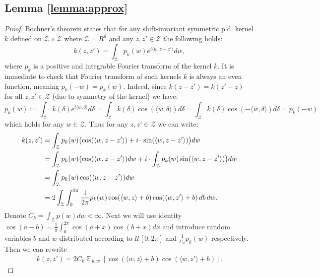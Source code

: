 \documentclass{article}
\DeclareMathOperator*{\E}{\mathbb{E}\,}
\newcommand{\Z}{\mathcal{Z}}
\begin{document}
\subsection{Lemma \ref{lemma:approx}}
\label{proof:ApproxLemma}
\begin{proof}
Bochner's theorem \citep{Rudin62} states that for any shift-invariant symmetric
p.d. kernel $k$ defined on $\Z\times \Z$ where $\Z=R^d$ and any $z,z'\in \Z$
the following holds:
\begin{equation}
\label{eq:bochner-first}
k(z,z') = \int_{\Z}p_k(w) e^{i\langle w, z-z'\rangle} dw,
\end{equation}
where $p_k$ is a positive and integrable Fourier transform of the kernel $k$.
It is immediate to check that Fourier transform of such kernels $k$ is always
an even function, meaning $p_k(-w)=p_k(w)$.  Indeed, since $k(z-z')=k(z'-z)$
for all $z,z'\in\Z$ (due to symmetry of the kernel) we have:
\[
p_k(w) := \int_{\Z}k(\delta) e^{i\langle w, \delta\rangle}d\delta
=
\int_{\Z}k(\delta) \cos(\langle w, \delta\rangle)d\delta
=
\int_{\Z}k(\delta) \cos(-\langle w, \delta\rangle)d\delta
=
p_k(-w)
\]
which holds for any $w\in\Z$.
Thus for any $z,z'\in\Z$ we can write:
\begin{align}
\notag
k(z,z') &= \int_{\Z}p_k(w) \bigl(\cos(\langle w, z-z'\rangle)+i\cdot \sin(\langle w, z-z'\rangle)\bigr) dw\\
\notag
&=\int_{\Z}p_k(w) \bigl(\cos(\langle w, z-z'\rangle) dw +i\cdot \int_{\Z}p_k(w)\sin(\langle w, z-z'\rangle)\bigr) dw\\
\notag
&=\int_{\Z}p_k(w) \cos(\langle w, z-z'\rangle) dw\\
\notag
&=2\int_{\Z}\int_{0}^{2\pi}\frac{1}{2\pi}p_k(w) \cos(\langle w, z\rangle+b)\cos(\langle w, z'\rangle+b)\, db\, dw.
\end{align}
Denote $C_k=\int_{\Z}p(w)dw<\infty$.  Next we will use identity
$\cos(a-b)=\frac{1}{\pi}\int_{0}^{2\pi}\cos(a+x)\cos(b+x)dx$ and introduce
random variables $b$ and $w$ distributed according to $\mathcal{U}[0,2\pi]$ and
$\frac{1}{C_k}p_k(w)$ respectively.  Then we can rewrite
\begin{align}
\label{eq:bochner-simple}
k(z,z')=2C_k\E_{b,w}\left[ \cos(\langle w, z\rangle+b)\cos(\langle w, z'\rangle+b)\right].
\end{align}


\end{proof}
\end{document}
